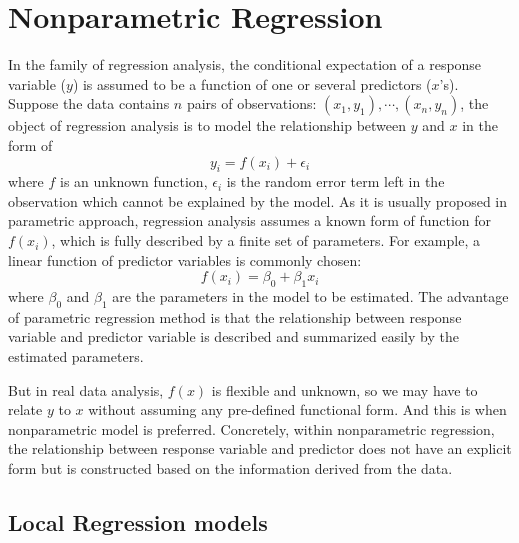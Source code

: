 \section{Nonparametric Regression}

In the family of regression analysis, the conditional expectation of a response 
variable ($y$) is assumed to be a function of one or several predictors ($x$'s). 
Suppose the data contains $n$ pairs of observations: 
$(x_1, y_1), \cdots, (x_n, y_n)$, the object of regression analysis is to model 
the relationship between $y$ and $x$ in the form of
\begin{equation} 
y_i = f(x_i) + \epsilon_i
\end{equation} 
where $f$ is an unknown function, $\epsilon_i$ is the random error term left in 
the observation which cannot be explained by the model. 
As it is usually proposed in parametric approach, regression analysis assumes a 
known form of function for $f(x_i)$, which is fully described by a finite 
set of parameters. For example, a linear function of predictor variables is 
commonly chosen:
\begin{equation} 
f(x_i) = \beta_0 + \beta_1x_i
\end{equation} 
where $\beta_0$ and $\beta_1$ are the parameters in the model to be estimated. 
The advantage of parametric regression method is that the relationship 
between response variable and predictor variable is described and summarized 
easily by the estimated parameters.

But in real data analysis, $f(x)$ is flexible and unknown, so we may have to 
relate $y$ to $x$ without assuming any pre-defined functional form. And this is 
when nonparametric model is preferred. Concretely, within nonparametric 
regression, the relationship between response variable and predictor does not 
have an explicit form but is constructed based on the information derived from
the data.


\subsection{Local Regression models}


